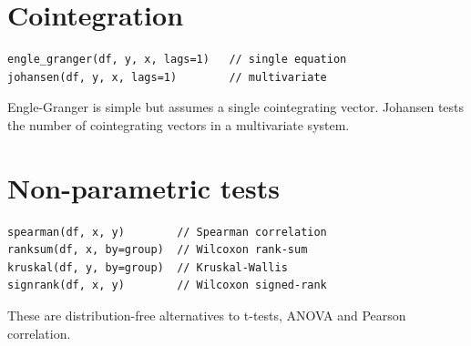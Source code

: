\section{Cointegration}

\begin{lstlisting}[caption={Cointegration tests}]
engle_granger(df, y, x, lags=1)   // single equation
johansen(df, y, x, lags=1)        // multivariate
\end{lstlisting}

Engle-Granger is simple but assumes a single cointegrating vector.
Johansen tests the number of cointegrating vectors in a multivariate
system.

\section{Non-parametric tests}

\begin{lstlisting}[caption={Non-parametric tests}]
spearman(df, x, y)        // Spearman correlation
ranksum(df, x, by=group)  // Wilcoxon rank-sum
kruskal(df, y, by=group)  // Kruskal-Wallis
signrank(df, x, y)        // Wilcoxon signed-rank
\end{lstlisting}

These are distribution-free alternatives to t-tests, ANOVA and Pearson
correlation.
